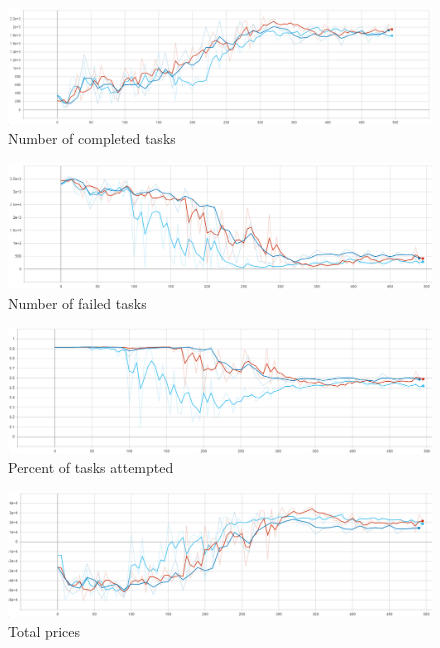 \begin{figure}[H]
    \centering
    \includegraphics[width=\linewidth]{figures/4_test_eval_figs/algo_training_fig/num_completed_tasks.PNG}
    \caption{Number of completed tasks}
    \label{fig:algo_num_completed_tasks}
\end{figure}

\begin{figure}[H]
    \centering
    \includegraphics[width=\linewidth]{figures/4_test_eval_figs/algo_training_fig/num_failed_tasks.png}
    \caption{Number of failed tasks}
    \label{fig:algo_num_failed_tasks}
\end{figure}

\begin{figure}[H]
    \centering
    \includegraphics[width=\linewidth]{figures/4_test_eval_figs/algo_training_fig/percent_tasks.png}
    \caption{Percent of tasks attempted}
    \label{fig:algo_percent_tasks}
\end{figure}

\begin{figure}[H]
    \centering
    \includegraphics[width=\linewidth]{figures/4_test_eval_figs/algo_training_fig/total_prices.png}
    \caption{Total prices}
    \label{fig:algo_total_prices}
\end{figure}

